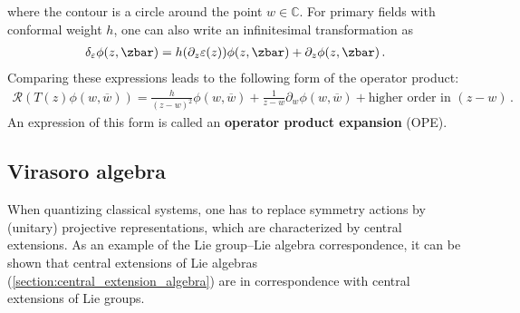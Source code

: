     where the contour is a circle around the point $w\in\mathbb{C}$. For primary fields with conformal weight $h$, one can also write an infinitesimal transformation as
    \begin{gather}
        \delta_\varepsilon\phi(z,\zbar) = h(\partial_z\varepsilon(z))\phi(z,\zbar) + \partial_z\phi(z,\zbar)\,.
    \end{gather}
    Comparing these expressions leads to the following form of the operator product:
    \begin{gather}
        \mathcal{R}(T(z)\phi(w,\overline{w})) = \frac{h}{(z-w)^2}\phi(w,\overline{w}) + \frac{1}{z-w}\partial_w\phi(w,\overline{w}) + \text{higher order in }(z-w)\,.
    \end{gather}
    An expression of this form is called an \textbf{operator product expansion} (OPE).

\subsection{Virasoro algebra}

    When quantizing classical systems, one has to replace symmetry actions by (unitary) projective representations, which are characterized by central extensions. As an example of the Lie group--Lie algebra correspondence, it can be shown that central extensions of Lie algebras (\cref{section:central_extension_algebra}) are in correspondence with central extensions of Lie groups.

